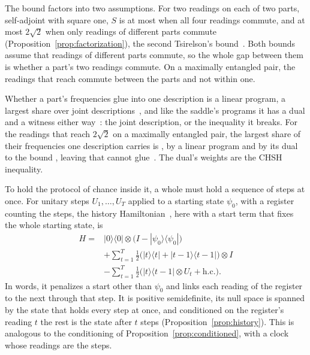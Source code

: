 \documentclass[aps,prd,reprint,superscriptaddress]{revtex4-2}
\begin{document}
The bound factors into two assumptions. For two readings on each of two parts, self-adjoint with square one, $S$ is at most  when all four readings commute, and at most $2\sqrt 2$ when only readings of different parts commute (Proposition~\ref{prop:factorization}), the second Tsirelson's bound~\cite{Tsirelson1980}. Both bounds assume that readings of different parts commute, so the whole gap between them is whether a part's two readings commute. On a maximally entangled pair, the readings that reach  commute between the parts and not within one.

Whether a part's frequencies glue into one description is a linear program, a largest share over joint descriptions~\cite{Fine1982,AbramskyBrandenburger2011}, and like the saddle's programs it has a dual and a witness either way~\cite{AbramskyBarbosaMansfield2017}: the joint description, or the inequality it breaks. For the readings that reach $2\sqrt 2$ on a maximally entangled pair, the largest share of their frequencies one description carries is , by a linear program and by its dual to the bound , leaving  that cannot glue~\cite{AbramskyBarbosaMansfield2017}. The dual's weights are the CHSH inequality.

To hold the protocol of chance inside it, a whole must hold a sequence of steps at once. For unitary steps $U_1, \dots, U_T$ applied to a starting state $\psi_0$, with a register counting the steps, the history Hamiltonian~\cite{Feynman1986,KitaevShenVyalyi2002}, here with a start term that fixes the whole starting state, is
\begin{equation}
\begin{split}
  H = {} & |0\rangle\langle 0| \otimes \big(I - |\psi_0\rangle\langle\psi_0|\big) \\
  & + \sum_{t=1}^{T} \tfrac12\big(|t\rangle\langle t| + |t{-}1\rangle\langle t{-}1|\big) \otimes I \\
  & - \sum_{t=1}^{T} \tfrac12\big(|t\rangle\langle t{-}1| \otimes U_t + \mathrm{h.c.}\big) .
\end{split}
  \label{eq:history}
\end{equation}
In words, it penalizes a start other than $\psi_0$ and links each reading of the register to the next through that step. It is positive semidefinite, its null space is spanned by the state that holds every step at once, and conditioned on the register's reading $t$ the rest is the state after $t$ steps (Proposition~\ref{prop:history}). This is analogous to the conditioning of Proposition~\ref{prop:conditioned}, with a clock whose readings are the steps.
\end{document}
